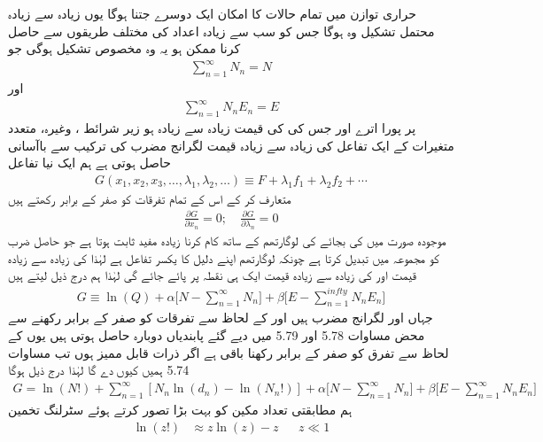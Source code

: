 حراری توازن میں تمام حالات کا امکان ایک دوسرے جتنا ہوگا یوں زیادہ سے زیادہ محتمل تشکیل   وہ ہوگا جس کو سب سے زیادہ اعداد کی مختلف طریقوں سے حاصل کرنا ممکن ہو یہ وہ مخصوص تشکیل ہوگی جو 
\begin{align}
\sum_{n = 1}^{\infty} N_n = N
\end{align}
اور 
\begin{align}
\sum_{n = 1}^{\infty} N_n E_n = E
\end{align}
پر پورا اترے اور جس کی  کی قیمت زیادہ سے زیادہ ہو زیر شرائط ،   وغیرہ،  متعدد متغیرات کے ایک تفاعل  کی زیادہ سے زیادہ قیمت لگرانج مضرب کی ترکیب سے  باآسانی حاصل ہوتی ہے ہم ایک نیا تفاعل 
\begin{align} 
G (x_1 , x_2 , x_3 , \dotsc , \lambda_1 , \lambda_2 , \dotsc) \equiv F + \lambda_1 f_1 + \lambda_2 f_2 + \cdots
\end{align}
متعارف کر کے اس کے تمام تفرقات کو صفر کے برابر رکھتے ہیں 
\begin{align}
\frac{\partial G}{\partial x_n} = 0; \quad \frac{\partial G}{\partial \lambda_n} = 0
\end{align}
موجودہ صورت میں  کی بجائے  کی لوگارتھم کے ساتھ کام کرنا زیادہ مفید ثابت ہوتا ہے جو حاصل ضرب کو مجموعہ میں تبدیل کرتا ہے چونکہ لوگارتھم اپنے دلیل کا یکسر تفاعل ہے لہٰذا  کی زیادہ سے زیادہ قیمت اور  کی زیادہ سے زیادہ قیمت ایک ہی نقطہ پر پائے جائے گی لہٰذا ہم درج ذیل لیتے ہیں 
\begin{align}
G \equiv \ln(Q) + \alpha \big [ N - \sum_{n = 1}^{\infty} N_n \big ] + \beta \big [ E - \sum_{n = 1}^{infty} N_n E_n \big ]
\end{align}
جہاں  اور  لگرانج مضرب ہیں  اور  کے لحاظ سے تفرقات کو صفر کے برابر رکھنے سے محض مساوات 5.78 اور 5.79 میں دیے گئے پابندیاں دوبارہ حاصل ہوتی ہیں یوں  کے لحاظ سے تفرق کو صفر کے برابر رکھنا باقی ہے اگر ذرات قابل ممیز ہوں تب مساوات 5.74 ہمیں کیوں دے گا لہٰذا درج ذیل ہوگا 
\begin{align}
G = \ln(N !) + \sum_{n = 1}^{\infty} [N_n \ln (d_n) - \ln(N_n !)] + \alpha \big [ N - \sum_{n = 1}^{\infty} N_n \big ] + \beta \big [ E - \sum_{n = 1}^{\infty} N_n E_n \big ]
\end{align}
ہم مطابقتی تعداد مکین  کو بہت بڑا تصور کرتے ہوئے سٹرلنگ تخمین 
\begin{align}
\ln(z !) &\approx z \ln(z) - z && z \ll 1
\end{align}
